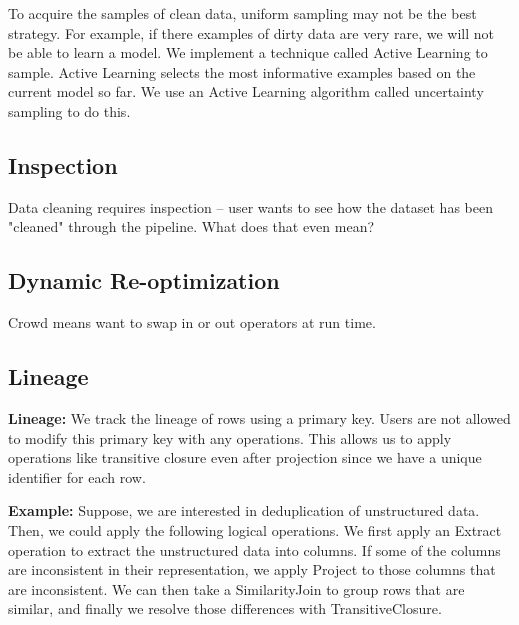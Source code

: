 \vspace{1em}

To acquire the samples of clean data, uniform sampling may not be the best strategy.
For example, if there examples of dirty data are very rare, we will not be able to learn a model.
We implement a technique called Active Learning to sample.
Active Learning selects the most informative examples based on the current model so far.
We use an Active Learning algorithm called uncertainty sampling to do this.




\subsection{Inspection}

Data cleaning requires inspection -- user wants to see how the dataset
has been "cleaned"  through the pipeline.  What does that even mean?

\subsection{Dynamic Re-optimization}

Crowd means want to swap in or out operators at run time.


\subsection{Lineage}

\noindent\textbf{Lineage: }
We track the lineage of rows using a primary key.
Users are not allowed to modify this primary key with any operations.
This allows us to apply operations like transitive closure even after projection since we have a unique identifier for each row.

\vspace{0.5em}
\noindent \textbf{Example: } Suppose, we are interested in deduplication of unstructured data. Then, we could apply the following logical operations.
We first apply an \textsf{Extract} operation to extract the unstructured data into columns. If some of the columns are inconsistent in their representation,
we apply \textsf{Project} to those columns that are inconsistent. We can then take a \textsf{SimilarityJoin} to group rows that are similar, and finally
we resolve those differences with \textsf{TransitiveClosure}.
\fi


